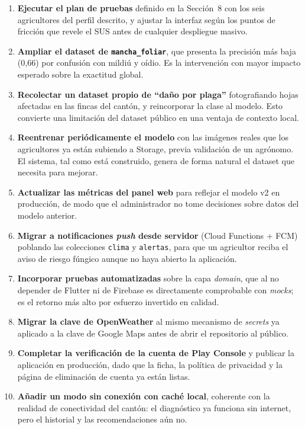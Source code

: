\documentclass[12pt,a4paper]{article}
\begin{document}
\begin{enumerate}
  \item \textbf{Ejecutar el plan de pruebas} definido en la Sección~8 con los
        seis agricultores del perfil descrito, y ajustar la interfaz según los
        puntos de fricción que revele el SUS antes de cualquier despliegue
        masivo.
  \item \textbf{Ampliar el dataset de \texttt{mancha\_foliar}}, que presenta la
        precisión más baja (0{,}66) por confusión con mildiú y oídio. Es la
        intervención con mayor impacto esperado sobre la exactitud global.
  \item \textbf{Recolectar un dataset propio de ``daño por plaga''} fotografiando
        hojas afectadas en las fincas del cantón, y reincorporar la clase al
        modelo. Esto convierte una limitación del dataset público en una ventaja
        de contexto local.
  \item \textbf{Reentrenar periódicamente el modelo} con las imágenes reales que
        los agricultores ya están subiendo a Storage, previa validación de un
        agrónomo. El sistema, tal como está construido, genera de forma natural el
        dataset que necesita para mejorar.
  \item \textbf{Actualizar las métricas del panel web} para reflejar el modelo v2
        en producción, de modo que el administrador no tome decisiones sobre datos
        del modelo anterior.
  \item \textbf{Migrar a notificaciones \textit{push} desde servidor} (Cloud
        Functions + FCM) poblando las colecciones \texttt{clima} y
        \texttt{alertas}, para que un agricultor reciba el aviso de riesgo fúngico
        aunque no haya abierto la aplicación.
  \item \textbf{Incorporar pruebas automatizadas} sobre la capa \textit{domain},
        que al no depender de Flutter ni de Firebase es directamente comprobable
        con \textit{mocks}; es el retorno más alto por esfuerzo invertido en
        calidad.
  \item \textbf{Migrar la clave de OpenWeather} al mismo mecanismo de
        \textit{secrets} ya aplicado a la clave de Google Maps antes de abrir el
        repositorio al público.
  \item \textbf{Completar la verificación de la cuenta de Play Console} y publicar
        la aplicación en producción, dado que la ficha, la política de privacidad
        y la página de eliminación de cuenta ya están listas.
  \item \textbf{Añadir un modo sin conexión con caché local}, coherente con la
        realidad de conectividad del cantón: el diagnóstico ya funciona sin
        internet, pero el historial y las recomendaciones aún no.
\end{enumerate}
\end{document}
